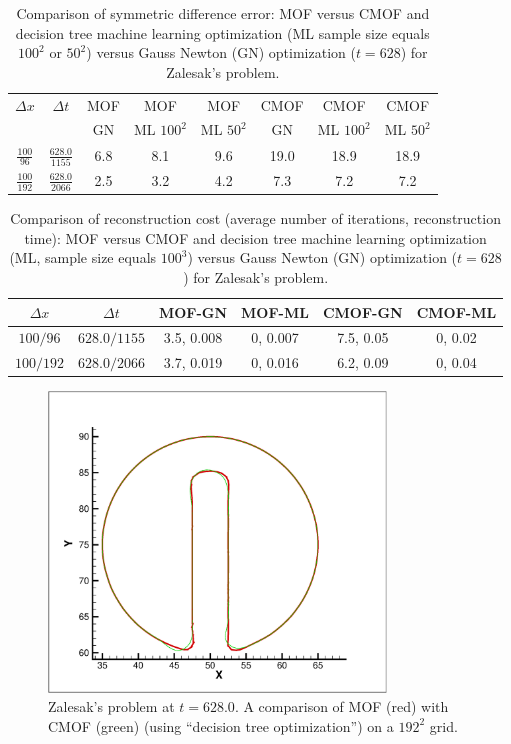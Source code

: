 \documentclass[]{article}
\begin{document}
\begin{table}[h!]
\caption{Comparison of symmetric difference error:
	MOF versus CMOF and decision tree
	machine learning optimization (ML sample size equals
        $100^{2}$ or $50^{2}$) versus 
	Gauss Newton (GN)
	optimization ($t=628$) for Zalesak's problem.  }
\centering	
\begin{tabular}{|c|c|c|c|c|c|c|c|}
\hline
$\Delta x$ & $\Delta t$ & MOF & MOF & MOF & CMOF & CMOF & CMOF  \\ 
& & GN & ML $100^{2}$ & ML $50^{2}$ & GN & ML $100^{2}$ & ML $50^{2}$ 
\\ \hline 
$\frac{100}{96}$ & $\frac{628.0}{1155}$ & 6.8 & 8.1 & 9.6 & 19.0 & 18.9 & 18.9
\\ \hline
$\frac{100}{192}$ & $\frac{628.0}{2066}$ & 2.5 & 3.2 & 4.2 & 7.3 & 7.2 & 7.2 
\\ \hline
\end{tabular}  
\label{zalesaktable}	
\end{table}

\begin{table}[h!]
\caption{Comparison of reconstruction cost 
 (average number of iterations, reconstruction time): 
  MOF versus CMOF and decision tree
  machine learning optimization (ML, sample size 
  equals $100^{3}$) versus 
  Gauss Newton (GN)
  optimization ($t=628$) for Zalesak's problem.  }
 \centering
\begin{tabular}{|c|c|c|c|c|c|}
\hline
$\Delta x$ & $\Delta t$ & MOF-GN & MOF-ML & CMOF-GN & CMOF-ML   \\ \hline
$100/96$ & $628.0/1155$ & 3.5, 0.008 & 0, 0.007 & 7.5, 0.05 & 0, 0.02 \\ \hline
$100/192$ & $628.0/2066$ & 3.7, 0.019 & 0, 0.016 & 6.2, 0.09 & 0, 0.04 \\ \hline
\end{tabular}
\label{zalesakcost}
\end{table}

\begin{figure}[htbp]
\centering
\includegraphics[width=0.8\textwidth]{zalesak_compare.eps}
\caption{Zalesak's problem at $t=628.0$.  
A comparison of MOF (red) with CMOF (green)
(using ``decision tree optimization'') on
a $192^{2}$ grid.  }
\label{zalesak_compare}
\end{figure}
\end{document}
